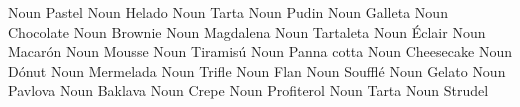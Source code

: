                  {}              {Noun}      {Pastel}                {}
            {}              {Noun}      {Helado}                {}
                  {}              {Noun}      {Tarta}                 {}
              {}              {Noun}      {Pudin}                 {}
               {}              {Noun}      {Galleta}               {}
            {}              {Noun}      {Chocolate}             {}
              {}              {Noun}      {Brownie}               {}
              {}              {Noun}      {Magdalena}             {}
              {}              {Noun}      {Tartaleta}             {}
               {}              {Noun}      {Éclair}                {}
              {}              {Noun}      {Macarón}               {}
               {}              {Noun}      {Mousse}                {}
             {}              {Noun}      {Tiramisú}              {}
          {}              {Noun}      {Panna cotta}           {}
           {}              {Noun}      {Cheesecake}            {}
                {}              {Noun}      {Dónut}                 {}
                  {}              {Noun}      {Mermelada}             {}
               {}              {Noun}      {Trifle}                {}
                 {}              {Noun}      {Flan}                  {}
              {}              {Noun}      {Soufflé}               {}
               {}              {Noun}      {Gelato}                {}
              {}              {Noun}      {Pavlova}               {}
              {}              {Noun}      {Baklava}               {}
                {}              {Noun}      {Crepe}                 {}
          {}              {Noun}      {Profiterol}            {}
                 {}              {Noun}      {Tarta}                 {}
              {}              {Noun}      {Strudel}               {}